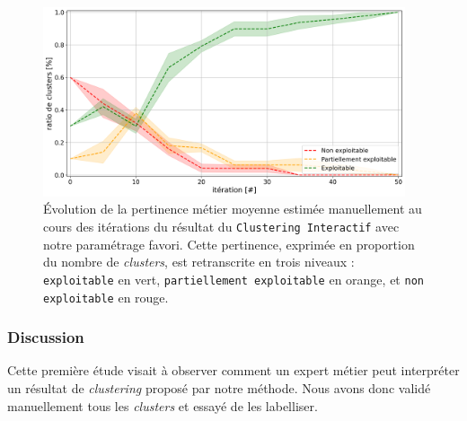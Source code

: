 			\begin{figure}[!htb]
				\centering
				\includegraphics[width=0.95\textwidth]{figures/etude-pertinence-llm-check-clustering-annotation-favori}
				\caption{
					Évolution de la pertinence métier moyenne estimée manuellement au cours des itérations du résultat du \texttt{Clustering Interactif} avec notre paramétrage favori.
					Cette pertinence, exprimée en proportion du nombre de \textit{clusters}, est retranscrite en trois niveaux : \texttt{exploitable} en vert, \texttt{partiellement exploitable} en orange, et \texttt{non exploitable} en rouge.
				}
				\label{figure:4.4.1-ETUDE-PERTINENCE-VALIDATION-MANUELLE}
			\end{figure}


		\subsubsection{Discussion}
		
			Cette première étude visait à observer comment un expert métier peut interpréter un résultat de \textit{clustering} proposé par notre méthode.
			Nous avons donc validé manuellement tous les \textit{clusters} et essayé de les labelliser.
			\\
			
